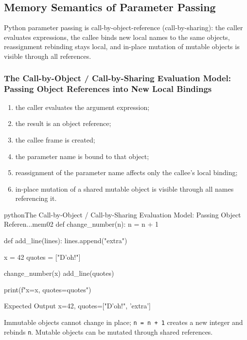 \subsection{Memory Semantics of Parameter Passing}

Python parameter passing is call-by-object-reference (call-by-sharing): the caller evaluates expressions, the callee binds new local names to the same objects, reassignment rebinding stays local, and in-place mutation of mutable objects is visible through all references.

\subsubsection{The Call-by-Object / Call-by-Sharing Evaluation Model: Passing Object References into New Local Bindings}

\begin{enumerate}
    \item the caller evaluates the argument expression;
    \item the result is an object reference;
    \item the callee frame is created;
    \item the parameter name is bound to that object;
    \item reassignment of the parameter name affects only the callee's local binding;
    \item in-place mutation of a shared mutable object is visible through all names referencing it.
\end{enumerate}

\begin{codebox}[]{python}{The Call-by-Object / Call-by-Sharing Evaluation Model: Passing Object Referen...}{mem02}
def change_number(n):
    n = n + 1

def add_line(lines):
    lines.append("extra")

x = 42
quotes = ["D'oh!"]

change_number(x)
add_line(quotes)

print(f"x={x}, quotes={quotes}")
\end{codebox}


\begin{iobox}{Expected Output}
x=42, quotes=["D'oh!", 'extra'] \\
\end{iobox}




Immutable objects cannot change in place; \texttt{n = n + 1} creates a new integer and rebinds \texttt{n}. Mutable objects can be mutated through shared references.

